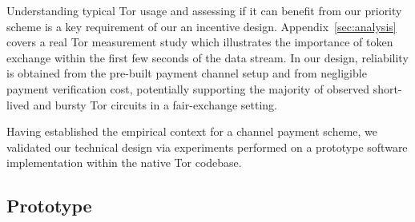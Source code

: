 Understanding typical Tor usage and assessing if it can benefit from
our priority scheme is a key requirement of our an incentive design.
Appendix~\ref{sec:analysis} covers a real Tor measurement study which
illustrates the importance of token exchange within the first few seconds of the
data stream. In our design, reliability is obtained from the pre-built payment
channel setup and from negligible payment verification cost, potentially
supporting the majority of observed short-lived and bursty Tor circuits in a
fair-exchange setting.

Having established the empirical context for a channel payment scheme, we
validated our technical design via experiments performed on a prototype software
implementation within the native Tor codebase.

\subsection{Prototype}

